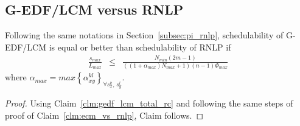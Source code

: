 \subsection{G-EDF/LCM versus RNLP}\label{subsec:gedf_lcm_vs_rnlp}
%
\begin{clm}\label{clm:gedf_lcm_vs_rnlp}
%
Following the same notations in Section~\ref{subsec:pi_rnlp}, schedulability of G-EDF/LCM is equal or better than schedulability of RNLP if 
%
\begin{eqnarray}
\frac{s_{max}}{L_{max}} & \le & \frac{N_{min}\left(2m-1\right)}{\left(\left(1+\alpha_{max}\right)N_{max}+1\right)(n-1)\Phi_{max}}\label{eq:gedf_lcm_rnlp_cmp_final}
\end{eqnarray}
%
where $\alpha_{max}=max\left\{\alpha_{xy}^{kl}\right\}_{\forall s_x^k,\,s_y^l}$.
%
\end{clm}
%
\begin{proof}
%
Using Claim~\ref{clm:gedf_lcm_total_rc} and following the same steps of proof of Claim~\ref{clm:ecm_vs_rnlp}, Claim follows.
%
\end{proof}
%
